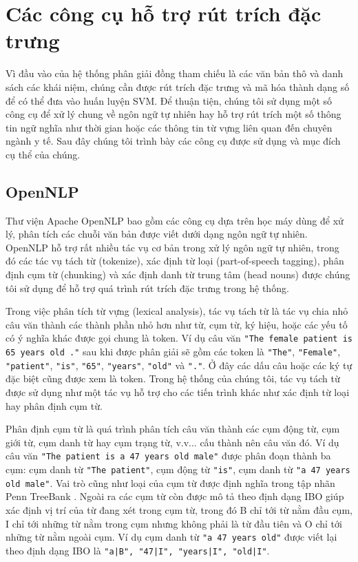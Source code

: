\section{Các công cụ hỗ trợ rút trích đặc trưng\label{tools}}
Vì đầu vào của hệ thống phân giải đồng tham chiếu là các văn bản thô và danh sách các khái niệm, chúng cần được rút trích đặc trưng và mã hóa thành dạng số để có thể đưa vào huấn luyện SVM. Để thuận tiện, chúng tôi sử dụng một số công cụ để xử lý chung về ngôn ngữ tự nhiên hay hỗ trợ rút trích một số thông tin ngữ nghĩa như thời gian hoặc các thông tin từ vựng liên quan đến chuyên ngành y tế. Sau đây chúng tôi trình bày các công cụ được sử dụng và mục đích cụ thể của chúng.

\subsection*{OpenNLP}
Thư viện Apache OpenNLP bao gồm các công cụ dựa trên học máy dùng để xử lý, phân tích các chuỗi văn bản được viết dưới dạng ngôn ngữ tự nhiên. OpenNLP hỗ trợ rất nhiều tác vụ cơ bản trong xử lý ngôn ngữ tự nhiên, trong đó các tác vụ tách từ (tokenize), xác định từ loại (part-of-speech tagging), phân định cụm từ (chunking) và xác định danh từ trung tâm (head nouns) được chúng tôi sử dụng để hỗ trợ quá trình rút trích đặc trưng trong hệ thống. 

Trong việc phân tích từ vựng (lexical analysis), tác vụ tách từ là tác vụ chia nhỏ câu văn thành các thành phần nhỏ hơn như từ, cụm từ, ký hiệu, hoặc các yếu tố có ý nghĩa khác được gọi chung là token. Ví dụ câu văn \texttt{"The female patient is 65 years old ."} sau khi được phân giải sẽ gồm các token là \texttt{"The"}, \texttt{"Female"}, \texttt{"patient"}, \texttt{"is"}, \texttt{"65"}, \texttt{"years"}, \texttt{"old"} và \texttt{"."}. Ở đây các dấu câu hoặc các ký tự đặc biệt cũng được xem là token. Trong hệ thống của chúng tôi, tác vụ tách từ được sử dụng như một tác vụ hỗ trợ cho các tiến trình khác như xác định từ loại hay phân định cụm từ.

Phân định cụm từ là quá trình phân tích câu văn thành các cụm động từ, cụm giới từ, cụm danh từ hay cụm trạng từ, v.v... cấu thành nên câu văn đó. Ví dụ câu văn \texttt{"The patient is a 47 years old male"} được phân đoạn thành ba cụm: cụm danh từ \texttt{"The patient"}, cụm động từ \texttt{"is"}, cụm danh từ \texttt{"a 47 years old male"}. Vai trò cũng như loại của cụm từ được định nghĩa trong tập nhãn Penn TreeBank \cite{Santorini1990}. Ngoài ra các cụm từ còn được mô tả theo định dạng IBO giúp xác định vị trí của từ đang xét trong cụm từ, trong đó B chỉ tới từ nằm đầu cụm, I chỉ tới những từ nằm trong cụm nhưng không phải là từ đầu tiên và O chỉ tới những từ nằm ngoài cụm. Ví dụ cụm danh từ \texttt{"a 47 years old"} được viết lại theo định dạng IBO là \texttt{"a|B", "47|I", "years|I", "old|I"}.

